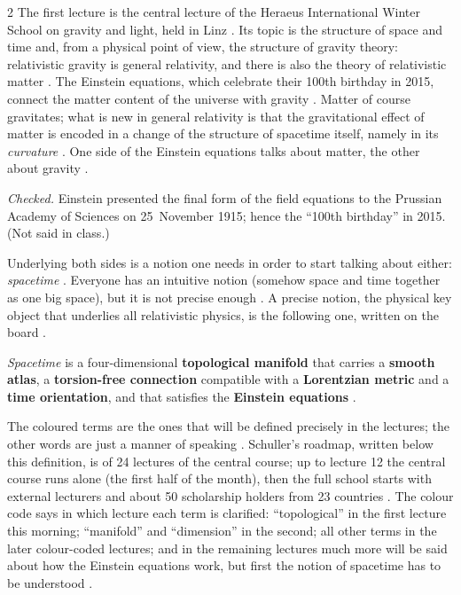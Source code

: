 \begin{paracol}{2}
The first lecture is the central lecture of the Heraeus International Winter School on gravity and light, held in Linz
. Its topic is the structure of space and time and, from a physical point of view, the structure
of gravity theory: relativistic gravity is general relativity, and there is also the theory of relativistic matter
. The Einstein equations, which celebrate their 100th birthday in 2015, connect the matter content
of the universe with gravity . Matter of course gravitates; what is new in general relativity is
that the gravitational effect of matter is encoded in a change of the structure of spacetime itself, namely in its
\emph{curvature} . One side of the Einstein equations talks about matter, the other about gravity
.

\begin{history}
\emph{Checked.} Einstein presented the final form of the field equations to the Prussian Academy of Sciences on
25~November 1915; hence the ``100th birthday'' in 2015. (Not said in class.)
\end{history}

Underlying both sides is a notion one needs in order to start talking about either: \emph{spacetime}
. Everyone has an intuitive notion (somehow space and time together as one big space), but it is
not precise enough . A precise notion, the physical key object that underlies all relativistic physics,
is the following one, written on the board .

\begin{definition}\label{def:c01-spacetime}
\emph{Spacetime} is a four-dimensional \textcolor{defcol}{\textbf{topological manifold}} that carries a
\textcolor{defcol}{\textbf{smooth atlas}}, a \textcolor{defcol}{\textbf{torsion-free connection}}
compatible with a \textcolor{defcol}{\textbf{Lorentzian metric}} and a \textcolor{defcol}{\textbf{time orientation}}, and that
satisfies the \textcolor{defcol}{\textbf{Einstein equations}} .
\end{definition}
The coloured terms are the ones that will be defined precisely in the lectures; the other words are just a manner of speaking
. Schuller's roadmap, written below this definition, is of 24 lectures of the central course; up to
lecture 12 the central course runs alone (the first half of the month), then the full school starts with external lecturers and
about 50 scholarship holders from 23 countries . The colour code says in which lecture each term
is clarified: ``topological'' in the first lecture this morning; ``manifold'' and ``dimension'' in the second; all other terms in
the later colour-coded lectures; and in the remaining lectures much more will be said about how the Einstein equations work, but
first the notion of spacetime has to be understood .


\end{paracol}

